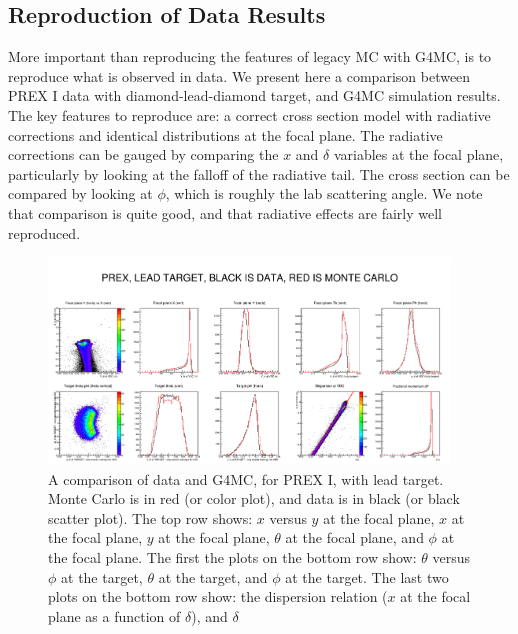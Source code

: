 \documentclass[11pt]{amsart}
\begin{document}
\subsection{Reproduction of Data Results}

More important than reproducing the features of legacy MC with G4MC, is to reproduce what is observed in data. We present here a comparison between PREX I data with diamond-lead-diamond target, and G4MC simulation results. The key features to reproduce are: a correct cross section model with radiative corrections and identical distributions at the focal plane. The radiative corrections can be gauged by comparing the $x$ and $\delta$ variables at the focal plane, particularly by looking at the falloff of the radiative tail. The cross section can be compared by looking at $\phi$, which is roughly the lab scattering angle. We note that comparison is quite good, and that radiative effects are fairly well reproduced.

\FloatBarrier
\begin{figure}
\begin{center}
\includegraphics[width=0.95\textwidth]{plots/compare_PREX_noscrape_truerad_tune.png}
\end{center}
\caption{A comparison of data and G4MC, for PREX I, with lead target. Monte Carlo is in red (or color plot), and data is in black (or black scatter plot). The top row shows: $x$ versus $y$ at the focal plane, $x$ at the focal plane, $y$ at the focal plane, $\theta$ at the focal plane, and $\phi$ at the focal plane. The first the plots on the bottom row show: $\theta$ versus $\phi$ at the target, $\theta$ at the target, and $\phi$ at the target. The last two plots on the bottom row show: the dispersion relation ($x$ at the focal plane as a function of $\delta$), and $\delta$ }
\end{figure}
\FloatBarrier

\newpage
\end{document}
